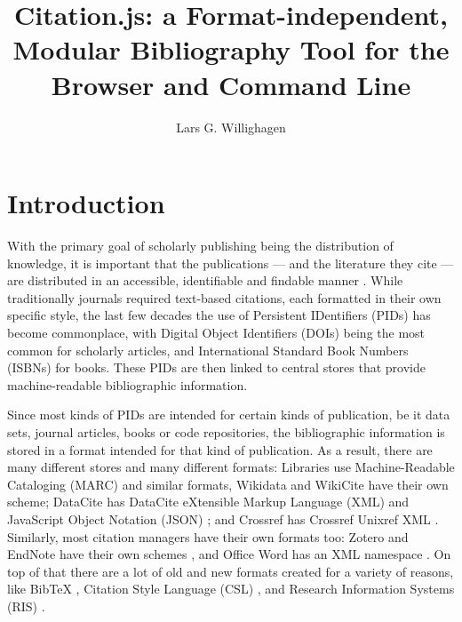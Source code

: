 \documentclass[fleqn,10pt,lineno]{wlpeerj} %
\title{Citation.js: a Format-independent, Modular Bibliography Tool for the Browser and Command Line}
\author[1]{Lars G. Willighagen}
\affil[1]{Eindhoven, The Netherlands}
\begin{document}
\flushbottom
\maketitle
\thispagestyle{empty}

\section*{Introduction}

With the primary goal of scholarly publishing being the distribution of knowledge, it is important that the publications --- and the literature they cite --- are distributed in an accessible, identifiable and findable manner \cite{shotton_publishing:_2013}. While traditionally journals required text-based citations, each formatted in their own specific style, the last few decades the use of Persistent IDentifiers (PIDs) has become commonplace, with Digital Object Identifiers (DOIs) being the most common for scholarly articles, and International Standard Book Numbers (ISBNs) for books. These PIDs are then linked to central stores that provide machine-readable bibliographic information.

Since most kinds of PIDs are intended for certain kinds of publication, be it data sets, journal articles, books or code repositories, the bibliographic information is stored in a format intended for that kind of publication. As a result, there are many different stores and many different formats: Libraries use Machine-Readable Cataloging (MARC) \cite{avram_machine-readable_nodate} and similar formats, Wikidata \citep{vrandecic_getting_2018} and WikiCite \citep{taraborelli_wikicite_2017} have their own scheme; DataCite has DataCite eXtensible Markup Language (XML) and JavaScript Object Notation (JSON) \citep{noauthor_datacite_2017}; and Crossref has Crossref Unixref XML \citep{noauthor_unixref_nodate}. Similarly, most citation managers have their own formats too: Zotero and EndNote have their own schemes \citep{vinckevicius_zotero_2017,noauthor_endnote_nodate}, and Office Word has an XML namespace \citep{noauthor_documentformat.openxml.bibliography_nodate}. On top of that there are a lot of old and new formats created for a variety of reasons, like BibTeX \citep{patashnik_bibtexing_1988}, Citation Style Language (CSL) \citep{zelle_csl_2012}, and Research Information Systems (RIS) \citep{noauthor_ris_2012}.
\end{document}
